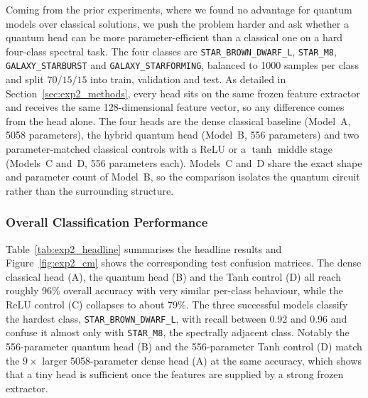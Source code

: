 Coming from the prior experiments, where we found no advantage for quantum models
over classical solutions, we push the problem harder and ask whether a quantum head
can be more parameter-efficient than a classical one on a hard four-class spectral
task. The four classes are \texttt{STAR\_BROWN\_DWARF\_L}, \texttt{STAR\_M8},
\texttt{GALAXY\_STARBURST} and \texttt{GALAXY\_STARFORMING}, balanced to 1000 samples
per class and split $70/15/15$ into train, validation and test. As detailed in
Section~\ref{sec:exp2_methods}, every head sits on the same frozen feature extractor
and receives the same 128-dimensional feature vector, so any difference comes from
the head alone. The four heads are the dense classical baseline (Model~A, 5058
parameters), the hybrid quantum head (Model~B, 556 parameters) and two
parameter-matched classical controls with a ReLU or a $\tanh$ middle stage
(Models~C and~D, 556 parameters each). Models~C and~D share the exact shape and
parameter count of Model~B, so the comparison isolates the quantum circuit rather
than the surrounding structure.

\subsubsection{Overall Classification Performance}

Table~\ref{tab:exp2_headline} summarises the headline results and
Figure~\ref{fig:exp2_cm} shows the corresponding test confusion matrices. The dense
classical head (A), the quantum head (B) and the Tanh control (D) all reach roughly
96\% overall accuracy with very similar per-class behaviour, while the ReLU control
(C) collapses to about 79\%. The three successful models classify the hardest
class, \texttt{STAR\_BROWN\_DWARF\_L}, with recall between 0.92 and 0.96 and confuse
it almost only with \texttt{STAR\_M8}, the spectrally adjacent class. Notably the
556-parameter quantum head (B) and the 556-parameter Tanh control (D) match the
$9\times$ larger 5058-parameter dense head (A) at the same accuracy, which shows
that a tiny head is sufficient once the features are supplied by a strong frozen
extractor.

